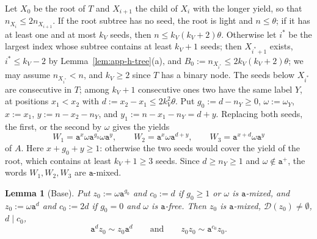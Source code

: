 \documentclass[11pt]{article}
\numberwithin{equation}{section}
\theoremstyle{plain}
\newtheorem{lemma}[theorem]{Lemma}
\theoremstyle{definition}
\theoremstyle{remark}
\newcommand{\D}{\mathcal{D}}
\theoremstyle{plain}
\begin{document}
Let $X_0$ be the root of $T$ and $X_{i+1}$ the child of $X_i$ with the longer
yield, so that $n_{X_i}\le2n_{X_{i+1}}$.  If the root subtree has no seed, the
root is light and $n\le\theta$; if it has at least one and at most $k_V$ seeds,
then $n\le k_V(k_V+2)\theta$.  Otherwise let $i^*$ be the largest index
whose subtree contains at least $k_V+1$ seeds; then $X_{i^*+1}$ exists,
$i^*\le k_V-2$ by Lemma~\ref{lem:app-h-tree}(a), and
$B_0:=n_{X_{i^*}}\le2k_V(k_V+2)\theta$; we may assume $n_{X_{i^*}}<n$, and
$k_V\ge2$ since $T$ has a binary node.  The seeds below $X_{i^*}$ are
consecutive in $T$; among $k_V+1$ consecutive ones two have the same label $Y$,
at positions $x_1<x_2$ with $d:=x_2-x_1\le2k_V^2\theta$.  Put $g_0:=d-n_Y\ge0$,
$\omega:=\omega_Y$, $x:=x_1$, $y:=n-x_2-n_Y$, and $y_1:=n-x_1-n_Y=d+y$.
Replacing both seeds, the first, or the second by $\omega$ gives the yields
\[
 W_1=\mathtt a^x\omega\mathtt a^{g_0}\omega\mathtt a^y,\qquad
 W_2=\mathtt a^x\omega\mathtt a^{d+y},\qquad
 W_3=\mathtt a^{x+d}\omega\mathtt a^y
\]
of $A$.  Here $x+g_0+y\ge1$: otherwise the two seeds would cover the yield of
the root, which contains at least $k_V+1\ge3$ seeds.  Since $d\ge n_Y\ge1$ and
$\omega\notin\mathtt a^+$, the words $W_1,W_2,W_3$ are $\mathtt a$-mixed.

\begin{lemma}[Base]
\label{lem:app-h-base}
Put $z_0:=\omega\mathtt a^{g_0}$ and $c_0:=d$ if $g_0\ge1$ or $\omega$ is
$\mathtt a$-mixed, and $z_0:=\omega\mathtt a^d$ and $c_0:=2d$ if $g_0=0$ and $\omega$
is $\mathtt a$-free.  Then $z_0$ is $\mathtt a$-mixed, $\D(z_0)\ne\emptyset$,
$d\mid c_0$,
\[
 \mathtt a^dz_0\sim z_0\mathtt a^d\qquad\text{and}\qquad z_0z_0\sim\mathtt a^{c_0}z_0.
\]
\end{lemma}
\end{document}

